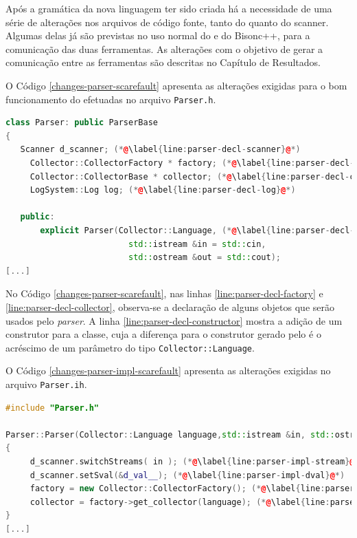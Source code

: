 Após a gramática da nova linguagem ter sido criada há a necessidade de
uma série de alterações nos arquivos de código fonte, tanto do \parser quanto do
\textsf{scanner}. Algumas delas já são previstas no uso normal do \flexcpp e do
\textsf{Bisonc++}, para a comunicação das duas ferramentas. As alterações com o
objetivo de gerar a comunicação entre as ferramentas são descritas no Capítulo de
Resultados.

O Código \ref{changes-parser-scarefault} apresenta as alterações exigidas para
o bom funcionamento do \scarefault efetuadas no arquivo \lstinline|Parser.h|.

\begin{lstlisting}[language=C++, label=changes-parser-scarefault, caption=Alterações no \lstinline|Parser.h| para uso do \scarefault]
class Parser: public ParserBase
{
   Scanner d_scanner; (*@\label{line:parser-decl-scanner}@*)
	 Collector::CollectorFactory * factory; (*@\label{line:parser-decl-factory}@*)
	 Collector::CollectorBase * collector; (*@\label{line:parser-decl-collector}@*)
	 LogSystem::Log log; (*@\label{line:parser-decl-log}@*)
        
   public:
	   explicit Parser(Collector::Language, (*@\label{line:parser-decl-constructor}@*)
		                 std::istream &in = std::cin,
		                 std::ostream &out = std::cout);
[...]
\end{lstlisting}

No Código \ref{changes-parser-scarefault}, nas linhas
\ref{line:parser-decl-factory} e \ref{line:parser-decl-collector}, observa-se
a declaração de alguns objetos que serão usados pelo \textit{parser}. A linha
\ref{line:parser-decl-constructor} mostra a adição de um construtor para a
classe, cuja a diferença para o construtor gerado pelo \bisoncpp é o acréscimo
de um parâmetro do tipo \lstinline|Collector::Language|.

O Código \ref{changes-parser-impl-scarefault} apresenta as alterações exigidas
no arquivo \lstinline|Parser.ih|.

\begin{lstlisting}[language=C++, label=changes-parser-impl-scarefault, caption=Alterações no \lstinline|Parser.ih| para uso do \scarefault]
#include "Parser.h"

Parser::Parser(Collector::Language language,std::istream &in, std::ostream &out) (*@\label{line:parser-impl-constructor}@*)
{
	 d_scanner.switchStreams( in ); (*@\label{line:parser-impl-stream}@*)
	 d_scanner.setSval(&d_val__); (*@\label{line:parser-impl-dval}@*)
	 factory = new Collector::CollectorFactory(); (*@\label{line:parser-impl-factory}@*)
	 collector = factory->get_collector(language); (*@\label{line:parser-impl-collector}@*)
}
[...]
\end{lstlisting}

